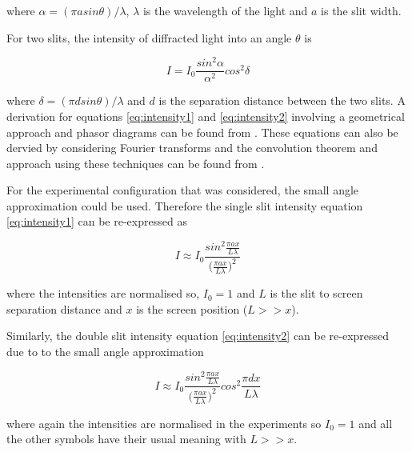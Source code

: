 \documentclass{article}
\begin{document}
\vspace{2mm}
\noindent
where $\alpha = ({\pi asin{\theta}}) / {\lambda}$, $\lambda$ is the wavelength of the light and $a$ is the slit width.

\vspace{2mm}
\noindent
For two slits, the intensity of diffracted light into an angle $\theta$ \cite{Paper02} is

\begin{equation}
\label{eq:intensity2}
I = I_0 \frac{sin^2{\alpha}}{\alpha^2} cos^2{\delta}
\end{equation}

\vspace{2mm}
\noindent
where $\delta = ({\pi dsin{\theta}}) / {\lambda}$ and $d$ is the separation distance between the two slits. A derivation for equations \eqref{eq:intensity1} and \eqref{eq:intensity2} involving a geometrical approach and phasor diagrams can be found from \cite{Book01}. These equations can also be dervied by considering Fourier transforms and the convolution theorem and approach using these techniques can be found from \cite{Web01}.

\vspace{2mm}
\noindent
For the experimental configuration that was considered, the small angle approximation could be used. Therefore the single slit intensity equation \eqref{eq:intensity1} can be re-expressed as

\begin{equation}
\label{eq:intensity_small1}
I \approx I_0 \frac{sin^2{\frac{\pi a x}{L \lambda}}}{\big(\frac{\pi a x}{L \lambda}\big)^2}
\end{equation}

\vspace{2mm}
\noindent
where the intensities are normalised so, $I_0 = 1$ and $L$ is the slit to screen separation distance and $x$ is the screen position ($L >> x$).

\vspace{2mm}
\noindent
Similarly, the double slit intensity equation \eqref{eq:intensity2} can be re-expressed due to to the small angle approximation

\begin{equation}
\label{eq:intensity_small2}
I \approx I_0 \frac{sin^2{\frac{\pi a x}{L \lambda}}}{\big(\frac{\pi a x}{L \lambda}\big)^2} cos^2{\frac{\pi d x}{L \lambda}}
\end{equation}

\vspace{2mm}
\noindent
where again the intensities are normalised in the experiments so $I_0 = 1$ and all the other symbols have their usual meaning with $L >> x$.
\end{document}
